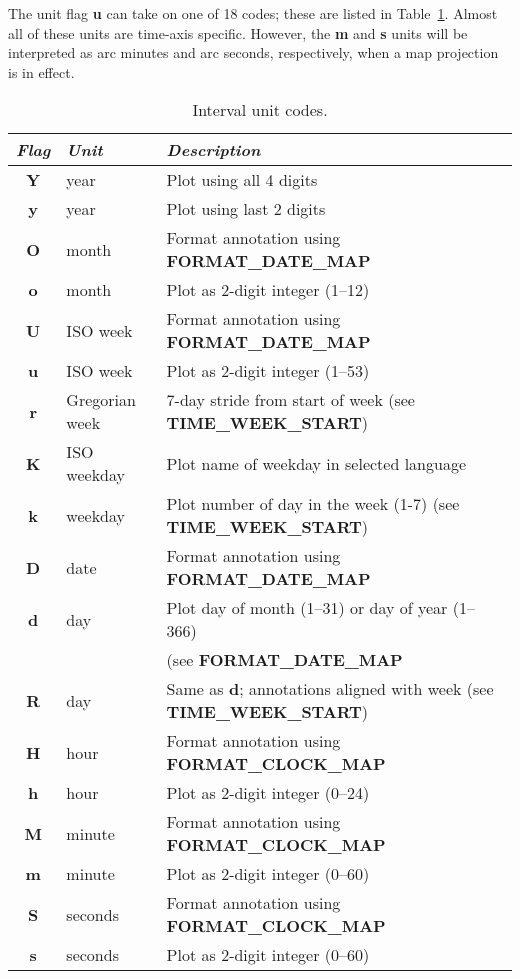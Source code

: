The unit flag \textbf{u} can take on one of 18 codes; these are listed in  Table~\ref{tbl:units}.
Almost all of these units are time-axis specific.  However, the \textbf{m} and \textbf{s} units will be
interpreted as arc minutes and arc seconds, respectively, when a map projection is in effect.

\begin{table}[h]
\centering
\begin{tabular}{|c|l|l|} \hline
\emph{Flag}	& \emph{Unit} & \emph{Description} \\ \hline
\textbf{Y}	&	year		& Plot using all 4 digits \\ \hline
\textbf{y}	&	year		& Plot using last 2 digits \\ \hline
\textbf{O}	&	month		& Format annotation using \textbf{FORMAT\_DATE\_MAP} \\ \hline
\textbf{o}	&	month		& Plot as 2-digit integer (1--12) \\ \hline
\textbf{U}	&	ISO week	& Format annotation using \textbf{FORMAT\_DATE\_MAP} \\ \hline
\textbf{u}	&	ISO week	& Plot as 2-digit integer (1--53) \\ \hline
\textbf{r}	&	Gregorian week	& 7-day stride from start of week (see \textbf{TIME\_WEEK\_START}) \\ \hline
\textbf{K}	&	ISO weekday	& Plot name of weekday in selected language \\ \hline
\textbf{k}	&	weekday		& Plot number of day in the week (1-7)  (see \textbf{TIME\_WEEK\_START})\\ \hline
\textbf{D}	&	date		& Format annotation using \textbf{FORMAT\_DATE\_MAP} \\ \hline
\textbf{d}	&	day		& Plot day of month (1--31) or day of year (1--366) \\
		&			& (see \bf{FORMAT\_DATE\_MAP} \\ \hline
\textbf{R}	&	day		& Same as \textbf{d}; annotations aligned with week (see \textbf{TIME\_WEEK\_START})\\ \hline
\textbf{H}	&	hour		& Format annotation using \textbf{FORMAT\_CLOCK\_MAP} \\ \hline
\textbf{h}	&	hour		& Plot as 2-digit integer (0--24) \\ \hline
\textbf{M}	&	minute		& Format annotation using \textbf{FORMAT\_CLOCK\_MAP} \\ \hline
\textbf{m}	&	minute		& Plot as 2-digit integer (0--60) \\ \hline
\textbf{S}	&	seconds		& Format annotation using \textbf{FORMAT\_CLOCK\_MAP} \\ \hline
\textbf{s}	&	seconds		& Plot as 2-digit integer (0--60) \\ \hline
\end{tabular}
\caption{Interval unit codes.}
\label{tbl:units}
\end{table}

